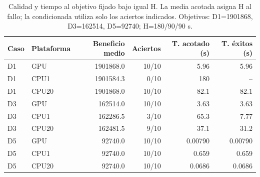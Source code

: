 \begin{table}[tbp]
\centering\small
\caption{Calidad y tiempo al objetivo fijado bajo igual H. La media acotada asigna H al fallo; la condicionada utiliza solo los aciertos indicados. Objetivos: D1=1901868, D3=162514, D5=92740; H=180/90/90 s.}
\label{tab:platform-quality}
\begin{tabular}{llrrrr}
\toprule
Caso & Plataforma & Beneficio medio & Aciertos & T. acotado (s) & T. éxitos (s)\\
\midrule
D1 & GPU & 1901868.0 & 10/10 & 5.96 & 5.96\\
D1 & CPU1 & 1901584.3 & 0/10 & 180 & --\\
D1 & CPU20 & 1901868.0 & 10/10 & 82.1 & 82.1\\
D3 & GPU & 162514.0 & 10/10 & 3.63 & 3.63\\
D3 & CPU1 & 162286.5 & 3/10 & 65.3 & 7.77\\
D3 & CPU20 & 162481.5 & 9/10 & 37.1 & 31.2\\
D5 & GPU & 92740.0 & 10/10 & 0.00790 & 0.00790\\
D5 & CPU1 & 92740.0 & 10/10 & 0.659 & 0.659\\
D5 & CPU20 & 92740.0 & 10/10 & 0.0686 & 0.0686\\
\bottomrule
\end{tabular}
\end{table}

